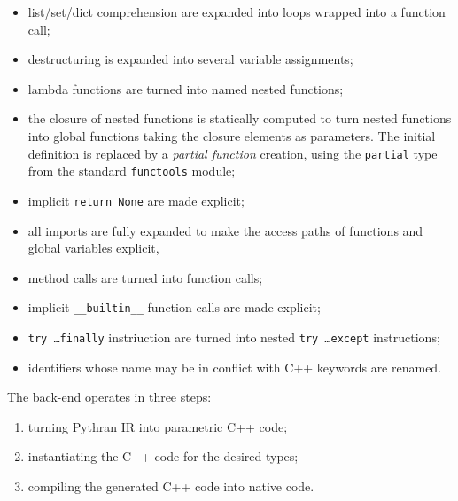 \documentclass[10pt, onecolumn, preprint]{sigplanconf}
\begin{document}
\begin{itemize}
    \item list/set/dict comprehension are expanded into loops wrapped into a function call;

    \item destructuring is expanded into several variable assignments;

    \item lambda functions are turned into named nested functions;

    \item the closure of nested functions is statically computed to turn nested
        functions into global functions taking the closure elements as
        parameters. The initial definition is replaced by a \emph{partial
        function} creation, using the \texttt{partial} type from the standard \texttt{functools} module;

    \item implicit \texttt{return None} are made explicit;

    \item all imports are fully expanded to make the access paths of functions and global variables explicit,

    \item method calls are turned into function calls;

    \item implicit \texttt{\_\_builtin\_\_} function calls are made explicit;

    \item \texttt{try \dots finally} instriuction are turned into nested \texttt{try \dots except} instructions;

    \item identifiers whose name may be in conflict with C++ keywords are renamed.

\end{itemize}

The back-end operates in three steps:

\begin{enumerate}

    \item turning Pythran IR into parametric C++ code;

    \item instantiating the C++ code for the desired types;

    \item compiling the generated C++ code into native code.%

\end{enumerate}
\end{document}
